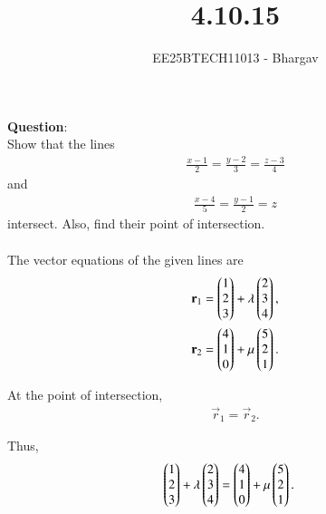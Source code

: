 \documentclass[journal]{IEEEtran}
\begin{document}

\vspace{3cm}

\title{4.10.15}
\author{EE25BTECH11013 - Bhargav}
\maketitle
{\let\newpage\relax\maketitle}

\renewcommand{\thefigure}{\theenumi}
\renewcommand{\thetable}{\theenumi}
\setlength{\intextsep}{10pt} %

\renewcommand{\thetable}{\theenumi}

\textbf{Question}:\\
Show that the lines
\begin{align}
\frac{x-1}{2} = \frac{y-2}{3} = \frac{z-3}{4}
\end{align}
and
\begin{align}
\frac{x-4}{5} = \frac{y-1}{2} = z
\end{align}
intersect. Also, find their point of intersection.\\

\solution \\

The vector equations of the given lines are
\begin{align}
\mathbf{r}_1 &= \begin{pmatrix}1\\2\\3\end{pmatrix} + \lambda \begin{pmatrix}2\\3\\4\end{pmatrix}, \\
\mathbf{r}_2 &= \begin{pmatrix}4\\1\\0\end{pmatrix} + \mu \begin{pmatrix}5\\2\\1\end{pmatrix}.
\end{align}

At the point of intersection,
\begin{align}
\vec{r}_1 = \vec{r}_2.
\end{align}

Thus,
\begin{align}
\begin{pmatrix}1\\2\\3\end{pmatrix} + \lambda \begin{pmatrix}2\\3\\4\end{pmatrix} &= \begin{pmatrix}4\\1\\0\end{pmatrix} + \mu \begin{pmatrix}5\\2\\1\end{pmatrix}.
\end{align}
\end{document}
